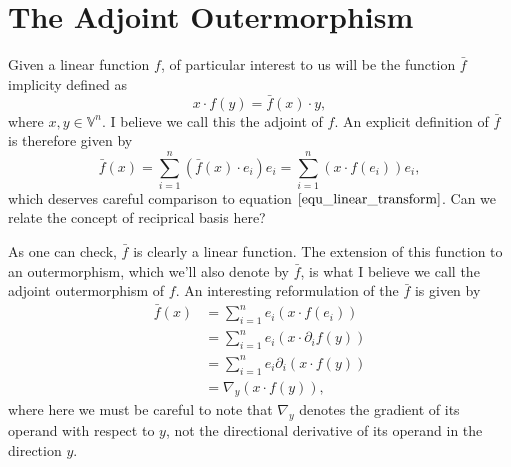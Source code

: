 \documentclass[12pt]{article}
\newcommand{\V}{\mathbb{V}}
\newcommand{\of}{\bar{f}}
\begin{document}
\section{The Adjoint Outermorphism}

Given a linear function $f$, of particular
interest to us will be the function $\of$ implicity defined as
\begin{equation*}
x\cdot f(y) = \of(x)\cdot y,
\end{equation*}
where $x,y\in\V^n$.  I believe we call this the adjoint of $f$.
An explicit definition of $\of$ is therefore given by
\begin{equation*}
\of(x) = \sum_{i=1}^n (\of(x)\cdot e_i)e_i = \sum_{i=1}^n (x\cdot f(e_i))e_i,
\end{equation*}
which deserves careful comparison to equation $\eqref{equ_linear_transform}$.
Can we relate the concept of reciprical basis here?

As one can check, $\of$ is clearly a linear function.  The extension of this
function to an outermorphism, which we'll also denote by $\of$, is what
I believe we call the adjoint outermorphism of $f$.  An interesting reformulation
of the $\of$ is given by
\begin{align*}
\of(x) &= \sum_{i=1}^n e_i(x\cdot f(e_i)) \\
 &= \sum_{i=1}^n e_i(x\cdot\partial_i f(y)) \\
 &= \sum_{i=1}^n e_i\partial_i(x\cdot f(y)) \\
 &= \nabla_y(x\cdot f(y)),
\end{align*}
where here we must be careful to note that $\nabla_y$ denotes the gradient of its operand
with respect to $y$, not the directional derivative of its operand in the direction $y$.
\end{document}
